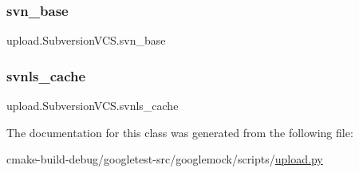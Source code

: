 \subsubsection{\texorpdfstring{svn\_base}{svn\_base}}
{\footnotesize\ttfamily upload.\+Subversion\+V\+C\+S.\+svn\+\_\+base}

\mbox{\label{classupload_1_1SubversionVCS_aa801782f807674b06f491df5d7ca9942}} 
\subsubsection{\texorpdfstring{svnls\_cache}{svnls\_cache}}
{\footnotesize\ttfamily upload.\+Subversion\+V\+C\+S.\+svnls\+\_\+cache}



The documentation for this class was generated from the following file\+:\begin{DoxyCompactItemize}
\item 
cmake-\/build-\/debug/googletest-\/src/googlemock/scripts/\mbox{\hyperlink{googlemock_2scripts_2upload_8py}{upload.\+py}}\end{DoxyCompactItemize}
